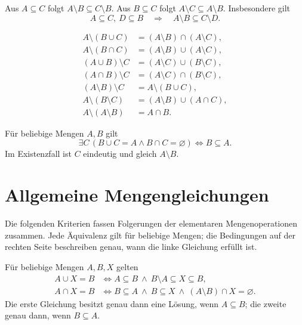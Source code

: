 \begin{theorem}
Aus $A\subseteq C$ folgt $A\setminus B\subseteq C\setminus B$.
Aus $B\subseteq C$ folgt $A\setminus C\subseteq A\setminus B$.
Insbesondere gilt
\[
 A\subseteq C,\ D\subseteq B
       \quad\Longrightarrow\quad A\setminus B\subseteq C\setminus D.
\]
\end{theorem}

\begin{theorem}
\[
\begin{aligned}
 A\setminus(B\cup C)&=(A\setminus B)\cap(A\setminus C),\\
 A\setminus(B\cap C)&=(A\setminus B)\cup(A\setminus C),\\
 (A\cup B)\setminus C&=(A\setminus C)\cup(B\setminus C),\\
 (A\cap B)\setminus C&=(A\setminus C)\cap(B\setminus C),\\
 (A\setminus B)\setminus C&=A\setminus(B\cup C),\\
 A\setminus(B\setminus C)&=(A\setminus B)\cup(A\cap C),\\
 A\setminus(A\setminus B)&=A\cap B.
\end{aligned}
\]
\end{theorem}

\begin{theorem}
Für beliebige Mengen $A,B$ gilt
\[
 \exists C\,(B\cup C=A\land B\cap C=\varnothing)
       \Longleftrightarrow B\subseteq A.
\]
Im Existenzfall ist $C$ eindeutig und gleich $A\setminus B$.
\end{theorem}

\section{Allgemeine Mengengleichungen}

Die folgenden Kriterien fassen Folgerungen der elementaren
Mengenoperationen zusammen. Jede Äquivalenz gilt für beliebige Mengen;
die Bedingungen auf der rechten Seite beschreiben genau, wann die
linke Gleichung erfüllt ist. \cite{hammack}

\begin{theorem}
Für beliebige Mengen $A,B,X$ gelten
\[
\begin{aligned}
 A\cup X=B
   &\Longleftrightarrow
     A\subseteq B\ \land\ B\setminus A\subseteq X\subseteq B,\\
 A\cap X=B
   &\Longleftrightarrow
     B\subseteq A\ \land\ B\subseteq X\ \land\
     (A\setminus B)\cap X=\varnothing.
\end{aligned}
\]
Die erste Gleichung besitzt genau dann eine Lösung, wenn
$A\subseteq B$; die zweite genau dann, wenn $B\subseteq A$.
\end{theorem}

